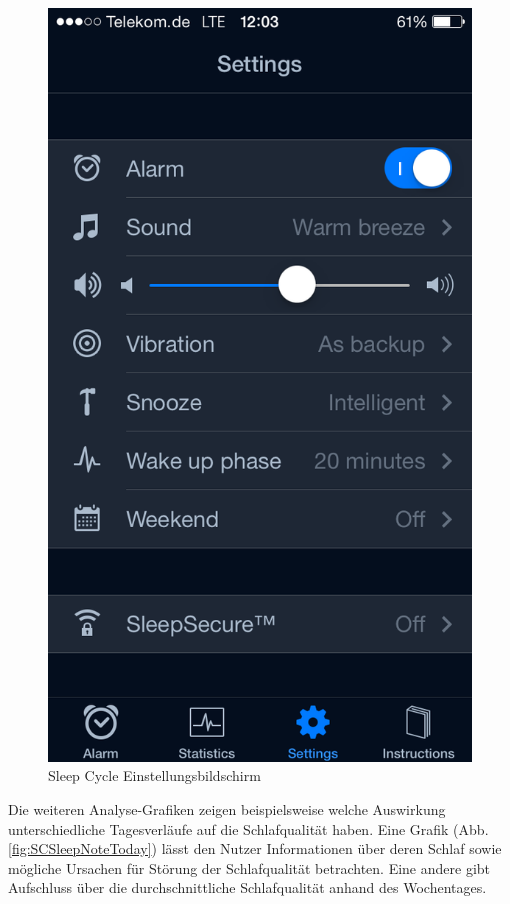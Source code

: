 \begin{figure}[H]
\begin{minipage}[t]{0.47\textwidth}
    \includegraphics[scale=0.3]{images/SleepCycle/Settings1}  
    \caption{Sleep Cycle Einstellungsbildschirm \cite{fig:SCSettings}}
    \label{fig:SCSettings}
  \end{minipage}
\end{figure}

Die weiteren Analyse-Grafiken zeigen beispielsweise welche Auswirkung unterschiedliche Tagesverläufe auf die Schlafqualität haben. 
Eine Grafik (Abb. \ref{fig:SCSleepNoteToday}) lässt den Nutzer Informationen über deren Schlaf sowie mögliche Ursachen für Störung der Schlafqualität betrachten.
Eine andere gibt Aufschluss über die durchschnittliche Schlafqualität anhand des Wochentages.

